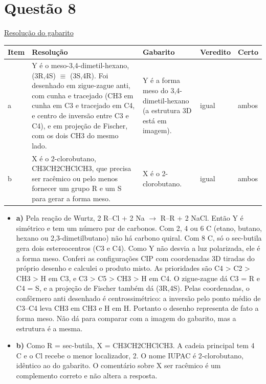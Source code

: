 \documentclass{article}%
\begin{document}
\section*{Questão 8}%
\href{https://poliedroresolve.sistemapoliedro.com.br/vestibulares/ime/2027/ime-2-fase-dia-3-28-10-2026-2-fase-dia-3/dissertativa-8-quimica-2-fase-dia-3-ime-2027}{Resolução do gabarito}\par\smallskip%
\begin{longtable}{@{}p{} p{} p{} p{} p{}@{}}\toprule Item & Resolução & Gabarito & Veredito & Certo \\ \midrule
a & Y é o meso{-}3,4{-}dimetil{-}hexano, (3R,4S) $\equiv$ (3S,4R). Foi desenhado em zigue{-}zague anti, com cunha e tracejado (CH3 em cunha em C3 e tracejado em C4, e centro de inversão entre C3 e C4), e em projeção de Fischer, com os dois CH3 do mesmo lado. & Y é a forma meso do 3,4{-}dimetil{-}hexano (a estrutura 3D está em imagem). & igual & ambos \\
b & X é o 2{-}clorobutano, CH3CH2CHClCH3, que precisa ser racêmico ou pelo menos fornecer um grupo R e um S para gerar a forma meso. & X é o 2{-}clorobutano. & igual & ambos \\
\bottomrule\end{longtable}%
\begin{itemize}%
\item%
\textbf{a)} Pela reação de Wurtz, 2 R--Cl + 2 Na $\to$ R--R + 2 NaCl. Então Y é simétrico e tem um número par de carbonos. Com 2, 4 ou 6 C (etano, butano, hexano ou 2,3{-}dimetilbutano) não há carbono quiral. Com 8 C, só o sec{-}butila gera dois estereocentros (C3 e C4). Como Y não desvia a luz polarizada, ele é a forma meso. Conferi as configurações CIP com coordenadas 3D tiradas do próprio desenho e calculei o produto misto. As prioridades são C4 > C2 > CH3 > H em C3, e C3 > C5 > CH3 > H em C4. O zigue{-}zague dá C3 = R e C4 = S, e a projeção de Fischer também dá (3R,4S). Pelas coordenadas, o confôrmero anti desenhado é centrossimétrico: a inversão pelo ponto médio de C3--C4 leva CH3 em CH3 e H em H. Portanto o desenho representa de fato a forma meso. Não dá para comparar com a imagem do gabarito, mas a estrutura é a mesma.%
\item%
\textbf{b)} Como R = sec{-}butila, X = CH3CH2CHClCH3. A cadeia principal tem 4 C e o Cl recebe o menor localizador, 2. O nome IUPAC é 2{-}clorobutano, idêntico ao do gabarito. O comentário sobre X ser racêmico é um complemento correto e não altera a resposta.%
\end{itemize}%
\end{document}
